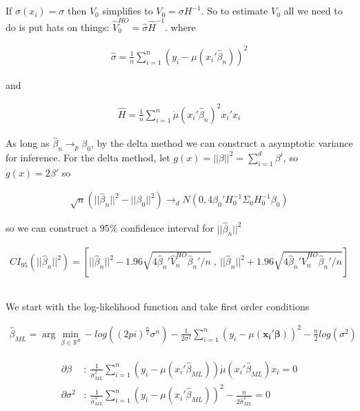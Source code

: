 \documentclass[12pt]{article}
\newcommand{\R}{\mathbb{R}}
\newcommand{\qsum}{\sum\limits_{i=1}^n}
\begin{document}
\subsection{}
If $\sigma(x_i) = \sigma$ then $V_0$ simplifies to $V_0 = \sigma H^{-1} $. So to estimate $V_0$ all we need to do is put hats on things: $\hat V^{HO}_0 = \hat\sigma \hat H^{-1} $. where


\begin{align*}
 \hat\sigma = \frac{1}{n} \qsum (y_i - \mu(x_i'\hat\beta_n))^2
\end{align*}

and

\begin{align*}
 \hat H =   \frac{1}{n} \qsum \dot{\mu}(x_i'\hat\beta_n)^2x_i'x_i
\end{align*}

As long as $\hat\beta_n \rightarrow_p \beta_0$, by the delta method we can construct a asymptotic variance for inference. For the delta method, let $g(x) = || \beta || ^2 = \sum\limits_{i=1}^d \beta^i$, so $\dot g(x) = 2\beta'$ so

\begin{align*}
  \sqrt{n}(||\hat\beta_n||^2 - ||\beta_0||^2) \rightarrow_d N(0,4\beta_0'H_0^{-1}\Sigma_0H_0^{-1}\beta_0)
\end{align*}


so we can construct a 95\% confidence interval for $||\hat\beta_n||^2$


\begin{align*}
  CI_{95}\left(||\hat\beta_n||^2 \right) = \left[||\hat\beta_n||^2  - 1.96\sqrt{4\hat\beta_n'\hat V^{HO}_n \hat\beta_n' / n} \ ,\ ||\hat\beta_n||^2  + 1.96\sqrt{4\hat\beta_n'\hat V^{HO}_n \hat\beta_n' / n} \right]
\end{align*}


\subsection{}
We start with the log-likelihood function and take first order conditions

\begin{align*}
  \hat\beta_{ML} = \arg \min_{\beta \in \R^d} - log((2pi)^{\frac{n}{2}} \sigma^n)- \frac{1}{2\sigma^2} \qsum(y_i - \mu(\mathbf{x_i'\beta}))^2 - \frac{n}{2}log(\sigma^2)
\end{align*}


\begin{align*}
  \partial \beta&: \    \frac{1}{\hat\sigma^2_{ML}} \qsum (y_i - \mu(x_i'\hat\beta_{ML}))\dot\mu(x_i'\hat\beta_{ML})x_i = 0 \\
  \partial \sigma^2 &:\  \frac{1}{\hat\sigma^4_{ML}} \qsum (y_i - \mu(x_i'\hat\beta_{ML}))^2 - \frac{n}{2\hat\sigma^2_{ML}}= 0
\end{align*}
\end{document}
